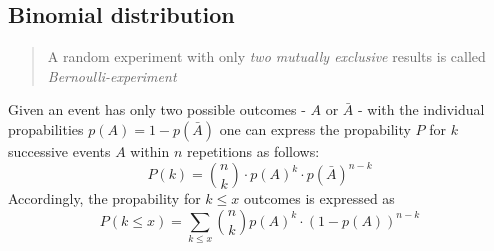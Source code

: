 \subsection{Binomial distribution}
\begin{quote}
    A random experiment with only \textit{two mutually exclusive} results is called \textit{Bernoulli-experiment}\cite{Papula.MatheFormelsammlung.2017}
\end{quote}
Given an event has only two possible outcomes - \(A\) or \(\bar{A}\) - with the individual propabilities \(p(A) = 1 - p(\bar{A})\)
one can express the propability \(P\) for \(k\) successive events \(A\) within \(n\) repetitions as follows:
\begin{equation}
    P(k) = \binom{n}{k} \cdot p(A)^k \cdot p(\bar{A})^{n-k}
    \label{eq:wahrscheinlichkeitsfunktion}
\end{equation}
Accordingly, the propability for \(k \leq x\) outcomes is expressed as
\begin{equation}
    P(k \leq x) = \sum_{k \leq x} \binom{n}{k}p(A)^k \cdot (1-p(A))^{n-k}
\end{equation}
